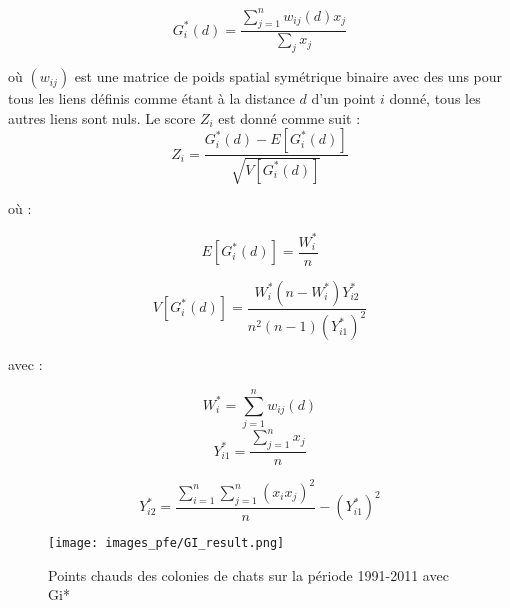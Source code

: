\medskip

\begin{equation}
  G_i^*(d) = \frac{\sum_{j=1}^n w_{ij}(d)x_j}{\sum_j x_j}
\end{equation}

\medskip
où $(w_{ij})$ est une matrice de poids spatial symétrique binaire avec des uns pour tous les liens définis comme étant à la distance $d$ d'un point $i$ donné, tous les autres liens sont nuls.
\medskip
Le score $Z_i$ est donné comme suit :
\medskip
\begin{equation}
  Z_i = \frac{G_i^*(d) - E [G_i^*(d)]}{\sqrt{V[G_i^*(d)]}}
\end{equation}

\medskip

où :

\medskip

\begin{equation}
  E[G_i^*(d)] = \frac{W_i^*}{n}
\end{equation}

\begin{equation}
  V[G_i^*(d)] = \frac{W_i^*(n - W_i^*)Y_{i2}^*}{n^2(n - 1) (Y_{i1}^*)^2}
\end{equation}

\medskip
avec :

\medskip
\begin{equation}
  W_i^* = \sum_{j=1}^n w_{ij}(d)
\end{equation}
\begin{equation}
  Y_{i1}^* = \frac{\sum_{j=1}^n x_j}{n}
\end{equation}

\begin{equation}
  Y_{i2}^* = \frac{\sum_{i=1}^n \sum_{j=1}^n (x_i x_j)^2}{n} - (Y_{i1}^*)^2
\end{equation}

\medskip

\begin{figure}[hbt!]
  \centering
  \texttt{[image: images\_pfe/GI\_result.png]}
  \caption{Points chauds des colonies de chats sur la période 1991-2011 avec Gi* \parencite{aguilar_distribution_2013}}
  \label{fig:gi-result}
\end{figure}
\FloatBarrier

\medskip

